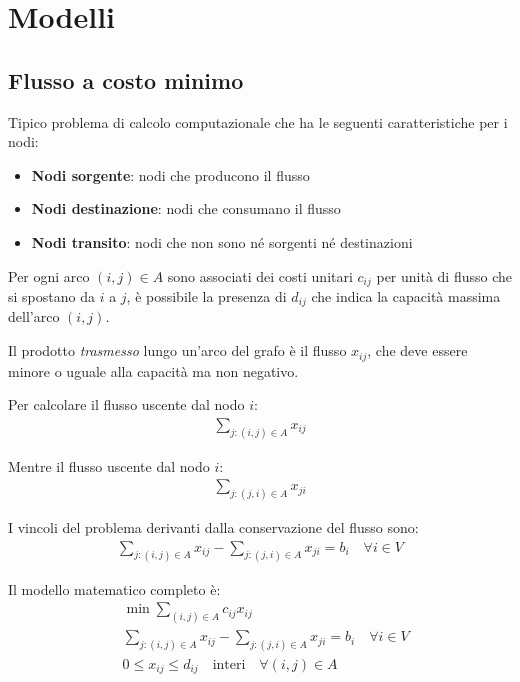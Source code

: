 \chapter{Modelli}
\section{Flusso a costo minimo}


Tipico problema di calcolo computazionale che ha le seguenti caratteristiche per i nodi:
\begin{itemize}
	\item \textbf{Nodi sorgente}: nodi che producono il flusso
	\item \textbf{Nodi destinazione}: nodi che consumano il flusso
	\item \textbf{Nodi transito}: nodi che non sono né sorgenti né destinazioni
\end{itemize}

Per ogni arco $(i, j) \in A$ sono associati dei costi unitari $c_{ij}$ per unità di flusso che si spostano da $i$ a $j$, è
possibile la presenza di $d_{ij}$ che indica la capacità massima dell'arco $(i, j)$.

Il prodotto \textit{trasmesso} lungo un'arco del grafo è il flusso $x_{ij}$, che deve essere minore o uguale alla capacità
ma non negativo.

Per calcolare il flusso uscente dal nodo $i$:
\begin{align}
	\sum_{j: (i, j) \in A} x_{ij}
\end{align}

Mentre il flusso uscente dal nodo $i$:
\begin{align}
	\sum_{j: (j, i) \in A} x_{ji}
\end{align}

I vincoli del problema derivanti dalla conservazione del flusso sono:
\begin{align}
	\sum_{j: (i, j) \in A} x_{ij} - \sum_{j: (j, i) \in A} x_{ji} = b_i \quad \forall i \in V
\end{align}



Il modello matematico completo è:
\begin{align}
	 & \min \sum_{(i, j) \in A} c_{ij} x_{ij}                                                    \\
	 & \sum_{j: (i, j) \in A} x_{ij} - \sum_{j: (j, i) \in A} x_{ji} = b_i \quad \forall i \in V \\
	 & 0 \leq x_{ij} \leq d_{ij} \quad \text{interi} \quad \forall (i, j) \in A
	\label{eq:flusso_costo_minimo}
\end{align}

